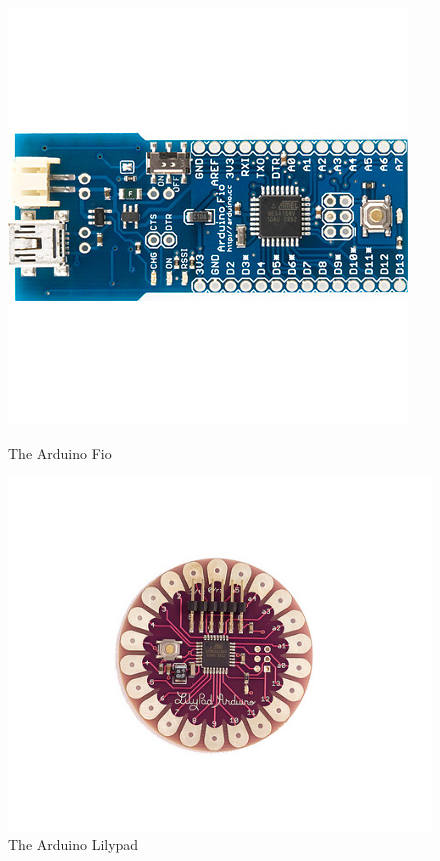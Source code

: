 \begin{figure}[H]
	\begin{minipage}[b]{0.5\linewidth}
		\centering
		\includegraphics[scale=0.35]{img/design-arduinofio}
		\caption{The Arduino Fio \cite{link:arduino-fio}}
		\label{fig:design-arduinofio}
	\end{minipage}
		\hspace{0.5cm}
	\begin{minipage}[b]{0.5\linewidth}
		\centering
		\includegraphics[scale=1.50]{img/design-arduinolilypad}
		\caption{The Arduino Lilypad \cite{link:arduino-lilypad}}
		\label{fig:design-arduinolilypad}
	\end{minipage}
\end{figure}

